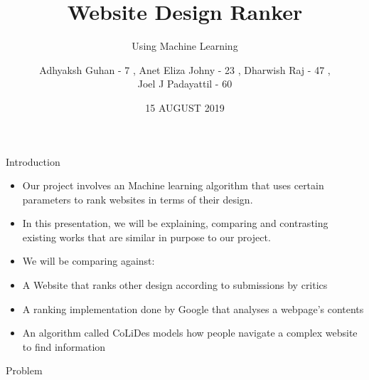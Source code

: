 \documentclass[11pt]{beamer}
\begin{document}
	\title{\textbf{Website Design Ranker}}
	\subtitle{Using Machine Learning}
	\date{15 AUGUST 2019}
	\author{{\scriptsize Adhyaksh Guhan - 7 , Anet Eliza Johny - 23 , Dharwish Raj - 47 , \\ Joel J Padayattil - 60}}
	\begin{frame}[plain]
		\maketitle
	\end{frame}
	\begin{frame}{Introduction}
		\begin{itemize}
			\item Our project involves an Machine learning algorithm that uses certain parameters to rank websites in terms of their design.
			
			\item In this presentation, we will be explaining, comparing and contrasting existing works that are similar in purpose to our project.
		
			\item We will be comparing against:
				\item A Website that ranks other design according to submissions by critics
				\item A ranking implementation done by Google that analyses a webpage's contents
				\item An algorithm called CoLiDes models how people navigate a complex website to find information
		\end{itemize}
	\end{frame}
	\begin{frame}{Problem}
	\end{frame}
\end{document}
